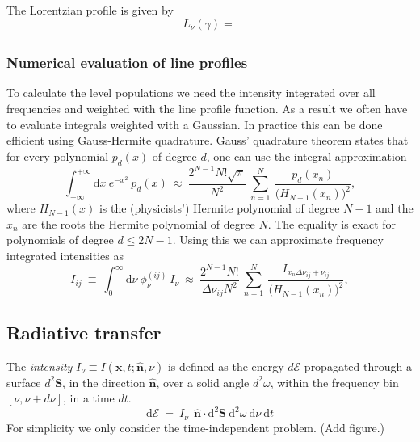 \documentclass[]{article}
\newcommand{\D}{\text{d}}
\begin{document}
The Lorentzian profile is given by
\begin{equation}
L_{\nu}(\gamma) = \frac{}{}
\end{equation}

\subsubsection{Numerical evaluation of line profiles}

To calculate the level populations we need the intensity integrated over all frequencies and weighted with the line profile function. As a result we often have to evaluate integrals weighted with a Gaussian. In practice this can be done efficient using Gauss-Hermite quadrature. Gauss' quadrature theorem states that for every polynomial $p_{d}(x)$ of degree $d$, one can use the integral approximation
\begin{equation}
\int_{-\infty}^{+\infty} \D x \ e^{-x^{2}} \ p_{d}(x) \ \approx \ \frac{2^{N-1}N!\sqrt{\pi}}{N^{2}} \ \sum_{n=1}^{N} \ \frac{p_{d}(x_{n})}{\big( H_{N-1}(x_{n}) \big)^{2}},
\end{equation}
where $H_{N-1}(x)$ is the (physicists') Hermite polynomial of degree $N-1$ and the $x_{n}$ are the roots  the Hermite polynomial of degree $N$. The equality is exact for polynomials of degree $d\leq2N-1$. Using this we can approximate frequency integrated intensities as
\begin{equation}
I_{ij} \ \equiv \ \int_{0}^{\infty} \D \nu \ \phi_{\nu}^{(ij)} \ I_{\nu} \ \approx \ \frac{2^{N-1}N!}{\Delta\nu_{ij} N^{2}} \ \sum_{n=1}^{N} \ \frac{ I_{ x_{n} \Delta\nu_{ij} + \nu_{ij} } }{\big( H_{N-1}(x_{n}) \big)^{2}},
\end{equation}



\subsection{Radiative transfer}

The \emph{intensity} $I_{\nu}\equiv I( \textbf{x},t;\hat{\textbf{n}},\nu)$ is defined as the energy $d\mathcal{E}$ propagated through a surface $d^{2}\textbf{S}$, in the direction $\hat{\textbf{n}}$, over a solid angle $d^{2}\omega$, within the frequency bin $[\nu,\nu+d\nu]$, in a time $dt$.
\begin{equation}
	\D \mathcal{E} \ = \ I_{\nu} \ \ \hat{\textbf{n}} \cdot \D^{2}\textbf{S} \ \D^{2}\omega \ \D\nu \ \D t
\end{equation}
For simplicity we only consider the time-independent problem. (Add figure.)
\end{document}
